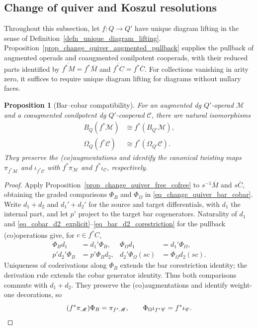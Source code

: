 \documentclass[11pt,letterpaper]{article}
\numberwithin{equation}{section}
\theoremstyle{plain}
\newtheorem{prop}[thm]{Proposition}
\theoremstyle{definition}
\theoremstyle{remark}
\begin{document}
\subsection{Change of quiver and Koszul resolutions}
\label{ss_change_quiver_koszul}

Throughout this subsection, let $f:Q\to Q'$ have unique diagram lifting
in the sense of Definition~\ref{defn_unique_diagram_lifting}.
Proposition~\ref{prop_change_quiver_augmented_pullback} supplies the
pullback of augmented operads and coaugmented conilpotent cooperads,
with their reduced parts identified by
$\overline{f^*M}=f^*\overline M$ and
$\overline{f^*C}=f^*\overline C$.
For collections vanishing in arity zero, it suffices to require unique
diagram lifting for diagrams without nullary faces.

\begin{prop}[Bar--cobar compatibility]
\label{prop_change_quiver_bar_cobar}
For an augmented dg $Q'$-operad $\mathscr M$ and a coaugmented
conilpotent dg $Q'$-cooperad $\mathscr C$, there are natural
isomorphisms
\begin{equation}\label{eq_change_quiver_bar_cobar}
\begin{aligned}
 B_Q(f^*\mathscr M)&\cong f^*(B_{Q'}\mathscr M),\\
 \Omega_Q(f^*\mathscr C)&\cong f^*(\Omega_{Q'}\mathscr C).
\end{aligned}
\end{equation}
They preserve the (co)augmentations and identify the canonical
twisting maps $\pi_{f^*\mathscr M}$ and $\iota_{f^*\mathscr C}$ with
$f^*\pi_{\mathscr M}$ and $f^*\iota_{\mathscr C}$, respectively.
\end{prop}
\begin{proof}
Apply Proposition~\ref{prop_change_quiver_free_cofree} to
$s^{-1}\overline M$ and $s\overline C$, obtaining the graded
comparisons $\Phi_B$ and $\Phi_\Omega$ in
\eqref{eq_change_quiver_bar_cobar}.
Write $d_1+d_2$ and $d_1'+d_2'$ for the source and target
differentials, with $d_1$ the internal part, and let $p'$ project
to the target bar cogenerators.
Naturality of $d_1$ and
\eqref{eq_cobar_d2_explicit}--\eqref{eq_bar_d2_corestriction}
for the pullback (co)operations give, for $c\in\overline{f^*C}$,
\[
\begin{aligned}
 \Phi_Bd_1&=d_1'\Phi_B,
 &\Phi_\Omega d_1&=d_1'\Phi_\Omega,\\
 p'd_2'\Phi_B&=p'\Phi_Bd_2,
 &d_2'\Phi_\Omega(sc)&=\Phi_\Omega d_2(sc).
\end{aligned}
\]
Uniqueness of coderivations along $\Phi_B$ extends the bar
corestriction identity; the derivation rule extends the cobar
generator identity. Thus both comparisons commute with $d_1+d_2$.
They preserve the (co)augmentations and identify weight-one
decorations, so
\[
 (f^*\pi_{\mathscr M})\Phi_B=\pi_{f^*\mathscr M},
 \qquad
 \Phi_\Omega\iota_{f^*\mathscr C}=f^*\iota_{\mathscr C}.
 \qedhere
\]
\end{proof}
\end{document}
